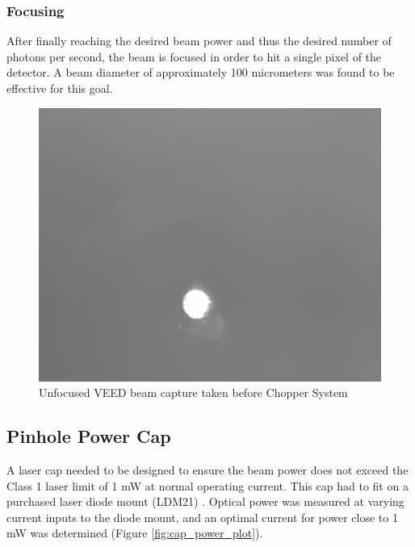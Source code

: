 \documentclass{article}
\begin{document}
    \subsubsection{Focusing}
    
    After finally reaching the desired beam power and thus the desired number of photons per second, the beam is focused in order to hit a single pixel of the detector. A beam diameter of approximately 100 micrometers was found to be effective for this goal.
    
    \begin{figure}[h]
        \centering
        \includegraphics[scale=0.2]{img/15ma_beam}
        \caption{Unfocused VEED beam capture taken before Chopper System}
        \label{fig:15mA_beam}
    \end{figure}
    
    \subsection{Pinhole Power Cap} \label{veed_cap}
    
    A laser cap needed to be designed to ensure the beam power does not exceed the Class 1 laser limit of 1 mW at normal operating current. This cap had to fit on a purchased laser diode mount (LDM21) \cite{ldm21}. Optical power was measured at varying current inputs to the diode mount, and an optimal current for power close to 1 mW was determined (Figure \ref{fig:cap_power_plot}).
    
\end{document}
